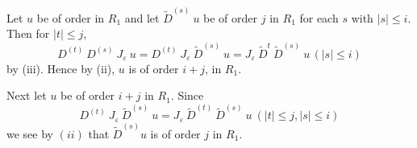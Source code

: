 \setcounter{Prooff}{0}
\begin{Prooff}%
 Let $u$ be of order in $R_1$ and let $\tilde{D}^{(s)} ~ u$ be of
 order $j$ in $R_1$ for each $s$ with $| s | \le i$. Then for $| t |
 \le j$, 
 $$
 D^{(t)} ~ D^{(s)} ~ J_\varepsilon ~ u = D^{(t)} ~ J_\varepsilon ~
 \tilde{D}^{(s)} ~ u = J_\varepsilon ~ \tilde{D}^t ~ \tilde{D}^{(s)}
 ~ u\, ( | s | \le i) 
 $$
 by (iii). Hence by (ii), $u$ is of order $i + j$, in $R_1$.
\end{Prooff}

Next let $u$ be of order $i + j$ in $R_1$. Since
$$
D^{(t)} ~ J_\varepsilon ~ \tilde{D}^{(s)} ~ u = J_\varepsilon ~
\tilde{D}^{(t)} ~ \tilde{D}^{(s)} ~ u ~ (|t|\le j, |s| \le i) 
$$
we see by $(ii)$ that $\tilde{D}^{(s)} u $ is of order $j$ in $R_1$.
